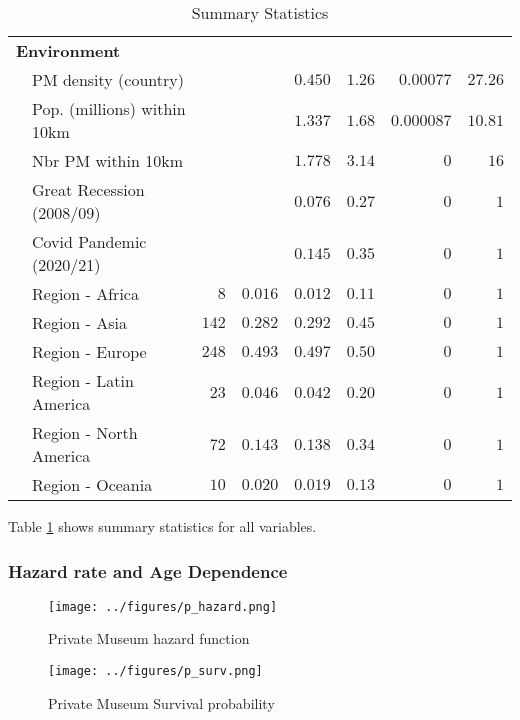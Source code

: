 \documentclass[12pt]{article}
\begin{document}
\begin{table}[ht]
\begin{tabular}{llrrrrrr}
   \multicolumn{8}{l}{\textbf{Environment}}                                                     \\ 
 & PM density (country)             &       &         & $0.450$ & $1.26$ & $0.00077$  & $27.26$ \\ 
 & Pop. (millions) within 10km      &       &         & $1.337$ & $1.68$ & $0.000087$ & $10.81$ \\ 
 & Nbr PM within 10km               &       &         & $1.778$ & $3.14$ & $0$        & $16$    \\ 
 & Great Recession (2008/09)        &       &         & $0.076$ & $0.27$ & $0$        & $1$     \\ 
 & Covid Pandemic (2020/21)         &       &         & $0.145$ & $0.35$ & $0$        & $1$     \\ 
 & Region - Africa                  & $8$   & $0.016$ & $0.012$ & $0.11$ & $0$        & $1$     \\ 
 & Region - Asia                    & $142$ & $0.282$ & $0.292$ & $0.45$ & $0$        & $1$     \\ 
 & Region - Europe                  & $248$ & $0.493$ & $0.497$ & $0.50$ & $0$        & $1$     \\ 
 & Region - Latin America           & $23$  & $0.046$ & $0.042$ & $0.20$ & $0$        & $1$     \\ 
 & Region - North America           & $72$  & $0.143$ & $0.138$ & $0.34$ & $0$        & $1$     \\ 
 & Region - Oceania                 & $10$  & $0.020$ & $0.019$ & $0.13$ & $0$        & $1$     \\ 
   \hline
\end{tabular}
\caption{Summary Statistics} 
\label{tbl:t_sumstats}
\end{table}

Table \ref{tbl:t_sumstats} shows summary statistics for all variables.
\subsubsection*{Hazard rate and Age Dependence}


\begin{figure}[htbp]
\centering
\texttt{[image: ../figures/p\_hazard.png]}
\caption{\label{fig:p_hazard}Private Museum hazard function}
\end{figure}

\begin{figure}[htbp]
\centering
\texttt{[image: ../figures/p\_surv.png]}
\caption{\label{fig:p_surv}Private Museum Survival probability}
\end{figure}
\end{document}
